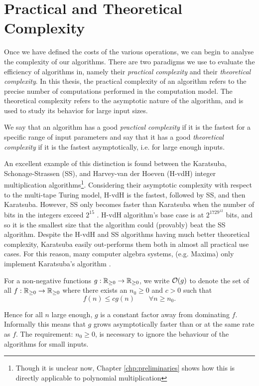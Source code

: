 \section{Practical and Theoretical Complexity}%
\label{sec:Practical and Theoretical Complexity}

Once we have defined the costs of the various operations, we can begin to analyse the complexity of our algorithms. There are two paradigms we use to evaluate the efficiency of algorithms in, namely their \emph{practical complexity} and their \emph{theoretical complexity}. In this thesis, the practical complexity of an algorithm refers to the precise number of computations performed in the computation model. The theoretical complexity refers to the asymptotic nature of the algorithm, and is used to study its behavior for large input sizes.

We say that an algorithm has a good \textit{practical complexity} if it is the fastest for a specific range of input parameters and say that it has a good \textit{theoretical complexity} if it is the fastest asymptotically, i.e. for large enough inputs.

An excellent example of this distinction is found between the Karatsuba, Schonage-Strassen (SS), and Harvey-van der Hoeven (H-vdH) integer multiplication algorithms\footnote{Though it is unclear now, Chapter \ref{chp:preliminaries} shows how this is directly applicable to polynomial multiplication}. Considering their asymptotic complexity with respect to the multi-tape Turing model, H-vdH is the fastest, followed by SS, and then Karatsuba. However, SS only becomes faster than Karatsuba when the number of bits in the integers exceed $2^{15}$ \cite{magma-archive}. H-vdH algorithm's base case is at $2^{1729^{12}}$ bits, and so it is the smallest size that the algorithm could (provably) beat the SS algorithm. Despite the H-vdH and SS algorithms having much better theoretical complexity, Karatsuba easily out-performs them both in almost all practical use cases. For this reason, many computer algebra systems, (e.g. Maxima) only implement Karatsuba's algorithm \cite{maxima-karatsuba}.

\begin{definition}
    For a non-negative functions $g: {\mathbb R}_{\ge 0} \to {\mathbb R}_{\ge 0}$, we write $\mathcal O(g)$ to denote the set of all $f: {\mathbb R}_{\ge 0} \to {\mathbb R}_{\ge 0}$ where there exists an $n_0 \ge 0$ and $c > 0$ such that
    \begin{equation}\label{eq:big-o}
        f(n) \le cg(n) \qquad \forall n \ge n_0.
    \end{equation}
\end{definition}
Hence for all $n$ large enough, $g$ is a constant factor away from dominating $f$. Informally this means that $g$ grows asymptotically faster than or at the same rate as $f$. The requirement: $n_0 \ge 0$, is necessary to ignore the behaviour of the algorithms for small inputs.

